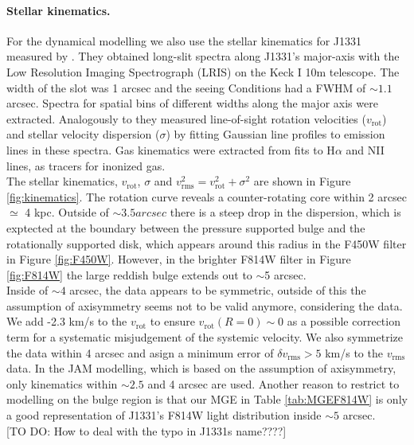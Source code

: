 \paragraph{Stellar kinematics.} For the dynamical modelling we also use the stellar kinematics for J1331 measured by \citet{SWELLSV}. They obtained long-slit spectra along J1331's major-axis with the Low Resolution Imaging Spectrograph (LRIS) on the Keck I 10m telescope. The width of the slot was 1 arcsec and the seeing Conditions had a FWHM of $\sim 1.1$ arcsec. Spectra for spatial bins of different widths along the major axis were extracted. Analogously to \citet{SWELLSII} they measured line-of-sight rotation velocities ($v_\text{rot}$) and stellar velocity dispersion ($\sigma$) by fitting Gaussian line profiles to emission lines in these spectra. Gas kinematics were extracted from fits to H$\alpha$ and NII lines, as tracers for inonized gas.
\\The stellar kinematics, $v_\text{rot}$, $\sigma$ and $v_\text{rms}^2=v_\text{rot}^2 + \sigma^2$ are shown in Figure \ref{fig:kinematics}. The rotation curve reveals a counter-rotating core within 2 arcsec $\simeq$ 4 kpc. Outside of $\sim 3.5 arcsec$ there is a steep drop in the dispersion, which is exptected at the boundary between the pressure supported bulge and the rotationally supported disk, which appears around this radius in the F450W filter in Figure \ref{fig:F450W}. However, in the brighter F814W filter in Figure \ref{fig:F814W}  the large reddish bulge extends out to $\sim$5 arcsec. 
\\Inside of $\sim 4$ arcsec, the data appears to be symmetric, outside of this the assumption of axisymmetry seems not to be valid anymore, considering the data. We add -2.3 km/s to the $v_\text{rot}$ to ensure $v_\text{rot}(R=0) \sim 0$ as a possible correction term for a systematic misjudgement of the systemic velocity. We also symmetrize the data within 4 arcsec and asign a minimum error of $\delta v_\text{rms} > 5$ km/s to the $v_\text{rms}$ data. In the JAM modelling, which is based on the assumption of axisymmetry, only kinematics within $\sim 2.5$ and 4 arcsec are used. Another reason to restrict to modelling on the bulge region is that our MGE in Table \ref{tab:MGEF814W} is only a good representation of J1331's F814W light distribution inside $\sim 5$ arcsec.\\

[TO DO: How to deal with the typo in J1331s name????]